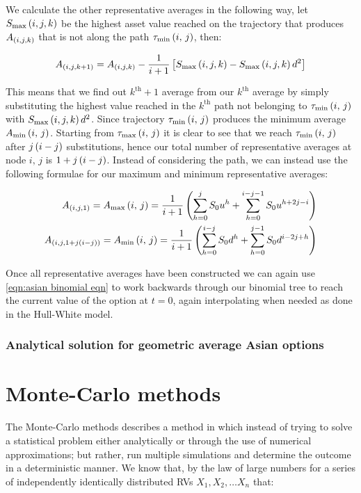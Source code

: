 We calculate the other representative averages in the following way, let \(S_\text{max}\left({i},{j},{k}\right)\) be the highest asset value reached on the trajectory that produces \(A_{\left(i,j,k\right)}\) that is not along the path \(\tau_{\text{min}}\left(i,\,j\right)\), then:

\begin{equation*}
    A_{\left(i,j,k+1\right)} = A_{\left(i,j,k\right)} -\frac{1}{i+1}\left[S_\text{max}\left({i},{j},{k}\right) - S_\text{max}\left({i},{j},{k}\right)d^2\right]
\end{equation*}

This means that we find out \(k^{\text{th}} + 1\) average from our \(k^{\text{th}}\) average by simply substituting the highest value reached in the \(k^\text{th}\) path not belonging to \(\tau_{\text{min}}\left(i,\,j\right)\) with \(S_\text{max}\left({i},{j},{k}\right)d^2\). Since trajectory \(\tau_{\text{min}}\left(i,\,j\right)\) produces the minimum average \(A_\text{min}\left(i,\,j\right)\). Starting from \(\tau_{\text{max}}\left(i,\,j\right)\) it is clear to see that we reach \(\tau_{\text{min}}\left(i,\,j\right)\) after \(j\left(i-j\right)\) substitutions, hence our total number of representative averages at node \(i,\,j\) is \(1+j\left(i-j\right)\).
\nline{}
Instead of considering the path, we can instead use the following formulae for our maximum and minimum representative averages:

\begin{align*}
    A_{\left(i,j,1\right)} = A_\text{max}\left(i,\,j\right) = \frac{1}{i+1}\left(\sum_{h=0}^j S_0u^h + \sum_{h=0}^{i-j-1}S_0u^{h+2j-i}\right) \\
    A_{\left(i,j,1+j\left(i-j\right)\right)} = A_\text{min}\left(i,\,j\right) = \frac{1}{i+1}\left(\sum_{h=0}^{i-j} S_0d^h + \sum_{h=0}^{j-1}S_0d^{i-2j+h}\right) 
\end{align*}

Once all representative averages have been constructed we can again use \autoref{eqn:asian binomial eqn} to work backwards through our binomial tree to reach the current value of the option at \(t = 0\), again interpolating when needed as done in the Hull-White model.

\subsubsection{Analytical solution for geometric average Asian options}

\section{Monte-Carlo methods}

The Monte-Carlo methods describes a method in which instead of trying to solve a statistical problem either analytically or through the use of numerical approximations; but rather, run multiple simulations and determine the outcome in a deterministic manner. We know that, by the law of large numbers for a series of independently identically distributed RVs \(X_1,X_2,\dots X_n\) that: 

